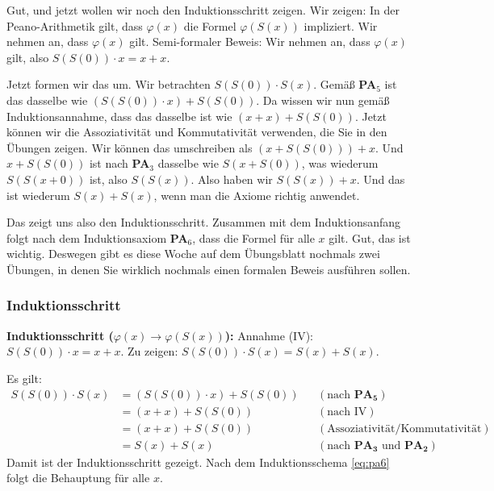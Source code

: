 \begin{spoken-clean}[00:28:30 - 00:31:45]
Gut, und jetzt wollen wir noch den Induktionsschritt zeigen. Wir zeigen: In der Peano-Arithmetik gilt, dass $\varphi(x)$ die Formel $\varphi(S(x))$ impliziert. Wir nehmen an, dass $\varphi(x)$ gilt. Semi-formaler Beweis: Wir nehmen an, dass $\varphi(x)$ gilt, also $S(S(0)) \cdot x = x + x$.

Jetzt formen wir das um. Wir betrachten $S(S(0)) \cdot S(x)$. Gemäß \textbf{PA$_5$} ist das dasselbe wie $(S(S(0)) \cdot x) + S(S(0))$. Da wissen wir nun gemäß Induktionsannahme, dass das dasselbe ist wie $(x + x) + S(S(0))$. Jetzt können wir die Assoziativität und Kommutativität verwenden, die Sie in den Übungen zeigen. Wir können das umschreiben als $(x + S(S(0))) + x$. Und $x + S(S(0))$ ist nach \textbf{PA$_3$} dasselbe wie $S(x + S(0))$, was wiederum $S(S(x + 0))$ ist, also $S(S(x))$. Also haben wir $S(S(x)) + x$. Und das ist wiederum $S(x) + S(x)$, wenn man die Axiome richtig anwendet.

Das zeigt uns also den Induktionsschritt. Zusammen mit dem Induktionsanfang folgt nach dem Induktionsaxiom \textbf{PA$_6$}, dass die Formel für alle $x$ gilt. Gut, das ist wichtig. Deswegen gibt es diese Woche auf dem Übungsblatt nochmals zwei Übungen, in denen Sie wirklich nochmals einen formalen Beweis ausführen sollen.
\end{spoken-clean}

\subsubsection{Induktionsschritt}
\begin{math-stroke}
\begin{short-proof}
\textbf{Induktionsschritt ($\varphi(x) \to \varphi(S(x))$):}
Annahme (IV): $S(S(0)) \cdot x = x + x$.
Zu zeigen: $S(S(0)) \cdot S(x) = S(x) + S(x)$.

Es gilt:
\begin{align*}
    S(S(0)) \cdot S(x) &= (S(S(0)) \cdot x) + S(S(0)) && (\text{nach } \mathbf{PA_5}) \\
    &= (x + x) + S(S(0)) && (\text{nach IV}) \\
    &= (x + x) + S(S(0)) && (\text{Assoziativität/Kommutativität}) \\
    &= S(x) + S(x) && (\text{nach } \mathbf{PA_3} \text{ und } \mathbf{PA_2})
\end{align*}
Damit ist der Induktionsschritt gezeigt. Nach dem Induktionsschema \eqref{eq:pa6} folgt die Behauptung für alle $x$.
\end{short-proof}
\end{math-stroke}

